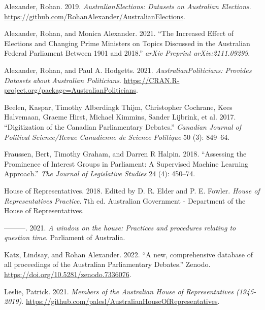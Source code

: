 \documentclass[
  letterpaper,
  DIV=11,
  numbers=noendperiod]{scrartcl}
\newlength{\cslhangindent}
\newlength{\cslentryspacingunit} %
\newenvironment{CSLReferences}[2] %
 {%
  \setlength{\parindent}{0pt}
  \ifodd #1
  \let\oldpar\par
  \def\par{\hangindent=\cslhangindent\oldpar}
  \fi
  \setlength{\parskip}{#2\cslentryspacingunit}
 }%
 {}
\begin{document}
\hypertarget{refs}{}
\begin{CSLReferences}{1}{0}
\leavevmode{}%
Alexander, Rohan. 2019. \emph{AustralianElections: Datasets on
Australian Elections}.
\url{https://github.com/RohanAlexander/AustralianElections}.

\leavevmode{}%
Alexander, Rohan, and Monica Alexander. 2021. {``The Increased Effect of
Elections and Changing Prime Ministers on Topics Discussed in the
Australian Federal Parliament Between 1901 and 2018.''} \emph{arXiv
Preprint arXiv:2111.09299}.

\leavevmode{}%
Alexander, Rohan, and Paul A. Hodgetts. 2021.
\emph{AustralianPoliticians: Provides Datasets about Australian
Politicians}.
\url{https://CRAN.R-project.org/package=AustralianPoliticians}.

\leavevmode{}%
Beelen, Kaspar, Timothy Alberdingk Thijm, Christopher Cochrane, Kees
Halvemaan, Graeme Hirst, Michael Kimmins, Sander Lijbrink, et al. 2017.
{``Digitization of the Canadian Parliamentary Debates.''} \emph{Canadian
Journal of Political Science/Revue Canadienne de Science Politique} 50
(3): 849--64.

\leavevmode{}%
Fraussen, Bert, Timothy Graham, and Darren R Halpin. 2018. {``Assessing
the Prominence of Interest Groups in Parliament: A Supervised Machine
Learning Approach.''} \emph{The Journal of Legislative Studies} 24 (4):
450--74.

\leavevmode{}%
House of Representatives. 2018. Edited by D. R. Elder and P. E. Fowler.
\emph{{House of Representatives Practice}}. 7th ed. {Australian
Government - Department of the House of Representatives}.

\leavevmode{}%
---------. 2021. \emph{{A window on the house: Practices and procedures
relating to question time}}. {Parliament of Australia}.

\leavevmode{}%
Katz, Lindsay, and Rohan Alexander. 2022. {``{A new, comprehensive
database of all proceedings of the Australian Parliamentary Debates}.''}
Zenodo. \url{https://doi.org/10.5281/zenodo.7336076}.

\leavevmode{}%
Leslie, Patrick. 2021. \emph{Members of the Australian House of
Representatives (1945-2019)}.
\url{https://github.com/palesl/AustralianHouseOfRepresentatives}.


\end{CSLReferences}
\end{document}
